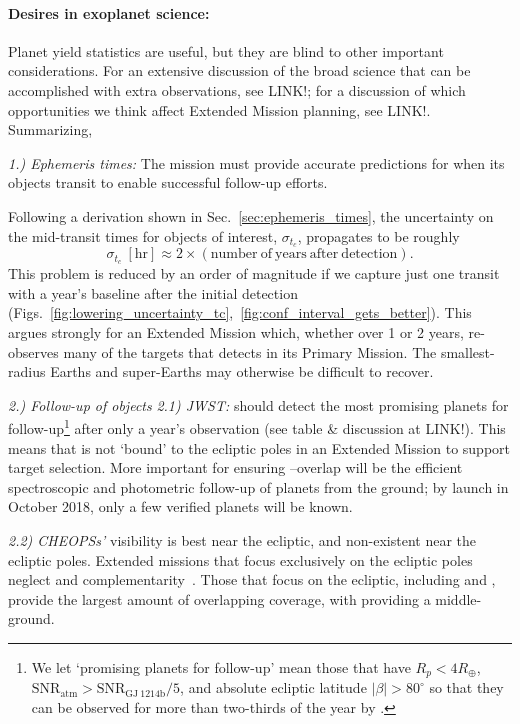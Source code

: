 \paragraph{Desires in exoplanet science:}
Planet yield statistics are useful, but they are blind to other important considerations. For an extensive discussion of the broad science that can be accomplished with extra \tess observations, see LINK!; for a discussion of which opportunities we think affect Extended Mission planning, see LINK!. Summarizing,

\textit{1.) Ephemeris times:}
The \tess mission must provide accurate predictions for when its objects transit to enable successful follow-up efforts.

Following a derivation shown in Sec.~\ref{sec:ephemeris_times},
the uncertainty on the mid-transit times for \tess objects of interest, $\sigma_{t_c}$, propagates to be roughly
$$\sigma_{t_c}\ \mathrm{[hr]} \approx 2\times\left(\mathrm{number\ of\ years\ after\ detection}\right). $$
This problem is reduced by an order of magnitude if we capture just one transit with a year's baseline after the initial detection (Figs.~\ref{fig:lowering_uncertainty_tc},~\ref{fig:conf_interval_gets_better}).
This argues strongly for an Extended Mission which, whether over 1 or 2 years, re-observes many of the targets that \tess detects in its Primary Mission. 
The smallest-radius Earths and super-Earths may otherwise be difficult to recover.

\textit{2.) Follow-up of \tess objects}\newline
\textit{2.1) JWST:} \tess should detect the most promising planets for \jwst follow-up\footnote{We let `promising planets for \jwst follow-up' mean those that have $R_p<4R_\oplus$, $\mathrm{SNR_{atm}} > \mathrm{SNR_{GJ\ 1214b}}/5$, and absolute ecliptic latitude $|\beta|>80^\circ$ so that they can be observed for more than two-thirds of the year by \jwst\!.} after only a year's observation (see table \& discussion at LINK!).
This means that \tess is not `bound' to the ecliptic poles in an Extended Mission to support \jwsts target selection.
More important for ensuring \jwst\!--\tess overlap will be the efficient spectroscopic and photometric follow-up of \tesss planets from the ground; by \jwsts launch in October 2018, only a few verified \tess planets will be known.

\textit{2.2) CHEOPSs'} visibility is best near the ecliptic, and non-existent near the ecliptic poles.
Extended missions that focus exclusively on the ecliptic poles neglect \tess and \cheopss complementarity~\citep{berta_cheops_2016}.
Those that focus on the ecliptic, including \elong\:and \eshort, provide the largest amount of overlapping coverage, with \npole\:providing a middle-ground.

